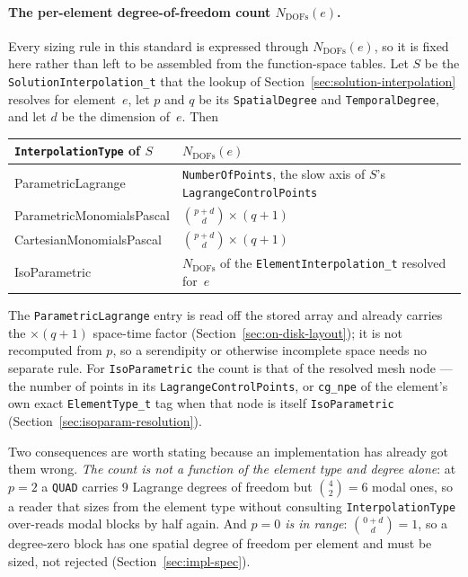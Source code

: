 \documentclass[11pt,letterpaper]{article}
\newif\ifvfourdraft
\newenvironment{v4block}{\ifvfourdraft\color{v4violet}\fi\ignorespaces}{\par}
\newcommand{\vfourmark}{\ifvfourdraft\textcolor{v4violet}{\textbf{[v4]}}\ \fi}
\begin{document}
\begin{v4block}
\paragraph{\vfourmark The per-element degree-of-freedom count $N_\mathrm{DOFs}(e)$.}
\label{sec:ndofs}
Every sizing rule in this standard is expressed through $N_\mathrm{DOFs}(e)$, so it
is fixed here rather than left to be assembled from the function-space tables.  Let
$S$ be the \texttt{SolutionInterpolation\_t} that the lookup of
Section~\ref{sec:solution-interpolation} resolves for element~$e$, let $p$ and $q$
be its \texttt{SpatialDegree} and \texttt{TemporalDegree}, and let $d$ be the
dimension of~$e$.  Then

\smallskip
\begin{tabular}{@{}>{\ttfamily}l l@{}}
\toprule
\normalfont\textbf{\texttt{InterpolationType} of $S$} & \textbf{$N_\mathrm{DOFs}(e)$} \\
\midrule
ParametricLagrange        & \texttt{NumberOfPoints}, the slow axis of $S$'s
                            \texttt{LagrangeControlPoints} \\
ParametricMonomialsPascal & $\binom{p+d}{d}\times(q+1)$ \\
CartesianMonomialsPascal  & $\binom{p+d}{d}\times(q+1)$ \\
IsoParametric             & $N_\mathrm{DOFs}$ of the \texttt{ElementInterpolation\_t}
                            resolved for~$e$ \\
\bottomrule
\end{tabular}

\smallskip
\noindent The \texttt{ParametricLagrange} entry is read off the stored array and
already carries the $\times(q+1)$ space-time factor
(Section~\ref{sec:on-disk-layout}); it is not recomputed from $p$, so a serendipity
or otherwise incomplete space needs no separate rule.  For \texttt{IsoParametric}
the count is that of the resolved mesh node --- the number of points in its
\texttt{LagrangeControlPoints}, or \texttt{cg\_npe} of the element's own exact
\texttt{ElementType\_t} tag when that node is itself \texttt{IsoParametric}
(Section~\ref{sec:isoparam-resolution}).

\smallskip
\noindent Two consequences are worth stating because an implementation has already
got them wrong.  \emph{The count is not a function of the element type and degree
alone}: at $p=2$ a \texttt{QUAD} carries $9$ Lagrange degrees of freedom but
$\binom{4}{2}=6$ modal ones, so a reader that sizes from the element type without
consulting \texttt{InterpolationType} over-reads modal blocks by half again.  And
\emph{$p=0$ is in range}: $\binom{0+d}{d} = 1$, so a degree-zero block has one
spatial degree of freedom per element and must be sized, not rejected
(Section~\ref{sec:impl-spec}).


\end{v4block}
\end{document}
